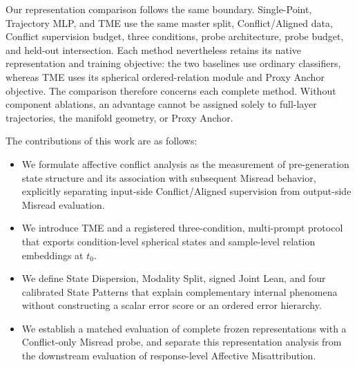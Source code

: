 Our representation comparison follows the same boundary. Single-Point,
Trajectory MLP, and TME use the same master split, Conflict/Aligned data, Conflict
supervision budget, three conditions, probe architecture, probe budget, and held-out
intersection. Each method nevertheless retains its native representation and training
objective: the two baselines use ordinary classifiers, whereas TME uses its spherical
ordered-relation module and Proxy Anchor objective. The comparison therefore concerns
each complete method. Without component ablations, an advantage cannot be assigned
solely to full-layer trajectories, the manifold geometry, or Proxy Anchor.

The contributions of this work are as follows:
\begin{itemize}
  \item We formulate affective conflict analysis as the measurement of
  pre-generation state structure and its association with subsequent Misread
  behavior, explicitly separating input-side Conflict/Aligned supervision from
  output-side Misread evaluation.
  \item We introduce TME and a registered three-condition, multi-prompt protocol that
  exports condition-level spherical states and sample-level relation embeddings at
  \(t_0\).
  \item We define State Dispersion, Modality Split, signed Joint Lean, and four
  calibrated State Patterns that explain complementary internal phenomena without
  constructing a scalar error score or an ordered error hierarchy.
  \item We establish a matched evaluation of complete frozen representations with a
  Conflict-only Misread probe, and separate this representation analysis from the
  downstream evaluation of response-level Affective Misattribution.
\end{itemize}

